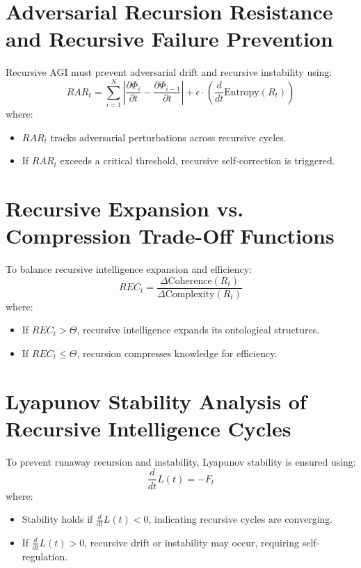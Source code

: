 \documentclass{article}
\begin{document}
\section{Adversarial Recursion Resistance and Recursive Failure Prevention}
Recursive AGI must prevent adversarial drift and recursive instability using:
\begin{equation}
RAR_t = \sum_{i=1}^{N} \left| \frac{\partial \Phi_i}{\partial t} - \frac{\partial \Phi_{i-1}}{\partial t} \right| + \epsilon \cdot \left( \frac{d}{dt} \text{Entropy}(R_t) \right)
\end{equation}
where:
\begin{itemize}
    \item $RAR_t$ tracks adversarial perturbations across recursive cycles.
    \item If $RAR_t$ exceeds a critical threshold, recursive self-correction is triggered.
\end{itemize}

\section{Recursive Expansion vs. Compression Trade-Off Functions}
To balance recursive intelligence expansion and efficiency:
\begin{equation}
REC_t = \frac{\Delta \text{Coherence}(R_t)}{\Delta \text{Complexity}(R_t)}
\end{equation}
where:
\begin{itemize}
    \item If $REC_t > \Theta$, recursive intelligence expands its ontological structures.
    \item If $REC_t \leq \Theta$, recursion compresses knowledge for efficiency.
\end{itemize}

\section{Lyapunov Stability Analysis of Recursive Intelligence Cycles}
To prevent runaway recursion and instability, Lyapunov stability is ensured using:
\begin{equation}
\frac{d}{dt} L(t) = -F_t
\end{equation}
where:
\begin{itemize}
    \item Stability holds if $\frac{d}{dt} L(t) < 0$, indicating recursive cycles are converging.
    \item If $\frac{d}{dt} L(t) > 0$, recursive drift or instability may occur, requiring self-regulation.
\end{itemize}
\end{document}
